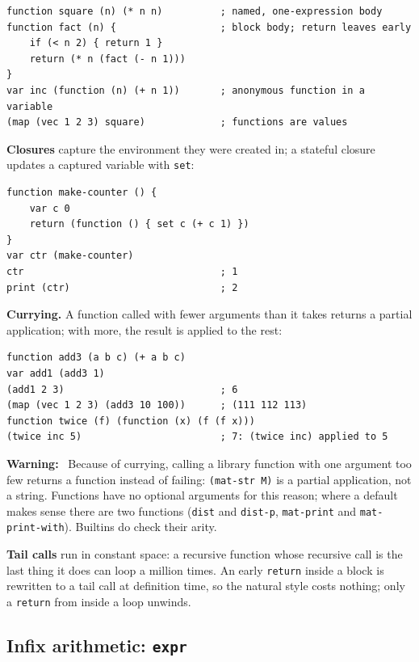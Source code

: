 \documentclass[11pt,a4paper]{article}
\newcommand{\musil}[1]{\lstinline[style=musilinline]{#1}}
\newenvironment{warn}{\begin{mdframed}[backgroundcolor=red!6,linecolor=musilred,linewidth=0.8pt]\textbf{Warning:}\ }{\end{mdframed}}
\begin{document}
\begin{lstlisting}
function square (n) (* n n)          ; named, one-expression body
function fact (n) {                  ; block body; return leaves early
    if (< n 2) { return 1 }
    return (* n (fact (- n 1)))
}
var inc (function (n) (+ n 1))       ; anonymous function in a variable
(map (vec 1 2 3) square)             ; functions are values
\end{lstlisting}

\textbf{Closures} capture the environment they were created in; a stateful closure
updates a captured variable with \musil{set}:

\begin{lstlisting}
function make-counter () {
    var c 0
    return (function () { set c (+ c 1) })
}
var ctr (make-counter)
ctr                                  ; 1
print (ctr)                          ; 2
\end{lstlisting}

\textbf{Currying.} A function called with fewer arguments than it takes returns a
partial application; with more, the result is applied to the rest:

\begin{lstlisting}
function add3 (a b c) (+ a b c)
var add1 (add3 1)
(add1 2 3)                           ; 6
(map (vec 1 2 3) (add3 10 100))      ; (111 112 113)
function twice (f) (function (x) (f (f x)))
(twice inc 5)                        ; 7: (twice inc) applied to 5
\end{lstlisting}

\begin{warn}
Because of currying, calling a library function with one argument too few returns a
function instead of failing: \musil{(mat-str M)} is a partial application, not a
string. Functions have no optional arguments for this reason; where a default makes
sense there are two functions (\musil{dist} and \musil{dist-p}, \musil{mat-print}
and \musil{mat-print-with}). Builtins do check their arity.
\end{warn}

\textbf{Tail calls} run in constant space: a recursive function whose recursive call is
the last thing it does can loop a million times. An early \musil{return} inside a
block is rewritten to a tail call at definition time, so the natural style costs
nothing; only a \musil{return} from inside a loop unwinds.

\subsection{Infix arithmetic: \texttt{expr}}
\end{document}
